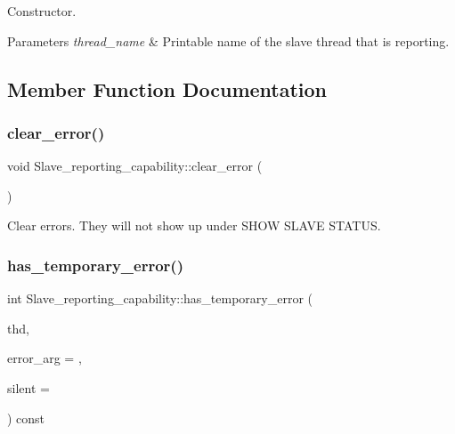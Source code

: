 Constructor.


\begin{DoxyParams}{Parameters}
{\em thread\+\_\+name} & Printable name of the slave thread that is reporting. \\
\hline
\end{DoxyParams}


\subsection{Member Function Documentation}
\mbox{\label{classSlave__reporting__capability_ac9a535ead59729c45f3d244490595a8e}} 
\subsubsection{\texorpdfstring{clear\+\_\+error()}{clear\_error()}}
{\footnotesize\ttfamily void Slave\+\_\+reporting\+\_\+capability\+::clear\+\_\+error (\begin{DoxyParamCaption}{ }\end{DoxyParamCaption})\hspace{0.3cm}{\ttfamily [inline]}}

Clear errors. They will not show up under {\ttfamily S\+H\+OW S\+L\+A\+VE S\+T\+A\+T\+US}. \mbox{\label{classSlave__reporting__capability_a9584c38b1663a71b9bbb8c7fcaf6133d}} 
\subsubsection{\texorpdfstring{has\+\_\+temporary\+\_\+error()}{has\_temporary\_error()}}
{\footnotesize\ttfamily int Slave\+\_\+reporting\+\_\+capability\+::has\+\_\+temporary\+\_\+error (\begin{DoxyParamCaption}\item[{T\+HD $\ast$}]{thd,  }\item[{uint}]{error\+\_\+arg = {},  }\item[{bool $\ast$}]{silent = {} }\end{DoxyParamCaption}) const}

